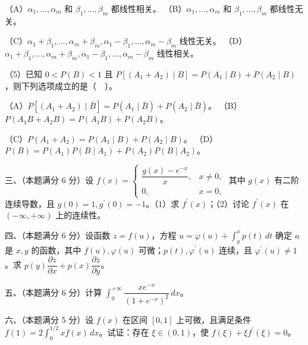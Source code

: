 \documentclass[UTF8,12pt]{ctexart}
\begin{document}
（A）\(\displaystyle \alpha_1,\allowbreak \ldots,\allowbreak \alpha_m\) 和 \(\displaystyle \beta_1,\allowbreak \ldots,\allowbreak \beta_m\) 都线性相关。 （B）\(\displaystyle \alpha_1,\allowbreak \ldots,\allowbreak \alpha_m\) 和 \(\displaystyle \beta_1,\allowbreak \ldots,\allowbreak \beta_m\) 都线性无关。


（C）\(\displaystyle \alpha_1+\beta_1,\allowbreak \ldots,\allowbreak \alpha_m+\beta_m,\allowbreak \alpha_1-\beta_1,\allowbreak \ldots,\allowbreak \alpha_m-\beta_m\) 线性无关。 （D）\(\displaystyle \alpha_1+\beta_1,\allowbreak \ldots,\allowbreak \alpha_m+\beta_m,\allowbreak \alpha_1-\beta_1,\allowbreak \ldots,\allowbreak \alpha_m-\beta_m\) 线性相关。


（5）已知 \(\displaystyle 0<P(B)<1\) 且 \(\displaystyle P[(A_1+A_2)\mid B]=P(A_1\mid B)+P(A_2\mid B)\)，则下列选项成立的是（　）。


（A）\(\displaystyle P[(A_1+A_2)\mid\bar B]=P(A_1\mid\bar B)+P(A_2\mid\bar B)\)。 （B）\(\displaystyle P(A_1B+A_2B)=P(A_1B)+P(A_2B)\)。


（C）\(\displaystyle P(A_1+A_2)=P(A_1\mid B)+P(A_2\mid B)\)。 （D）\(\displaystyle P(B)=P(A_1)P(B\mid A_1)+P(A_2)P(B\mid A_2)\)。


三、（本题满分 6 分）设 \(\displaystyle f(x)=\begin{cases}\dfrac{\displaystyle g(x)-e^{-x}}{\displaystyle x},\allowbreak &x\ne0,\allowbreak \\0,\allowbreak &x=0,\allowbreak \end{cases}\) 其中 \(\displaystyle g(x)\) 有二阶连续导数，且 \(\displaystyle g(0)=1,\allowbreak g^{\prime}(0)=-1\)。（1）求 \(\displaystyle f^{\prime}(x)\)；（2）讨论 \(\displaystyle f^{\prime}(x)\) 在 \(\displaystyle ( -\infty,\allowbreak +\infty)\) 上的连续性。


四、（本题满分 6 分）设函数 \(\displaystyle z=f(u)\)，方程 \(\displaystyle u=\varphi(u)+\displaystyle \int_y^x p(t)\,dt\) 确定 \(\displaystyle u\) 是 \(\displaystyle x,\allowbreak y\) 的函数，其中 \(\displaystyle f(u),\allowbreak \varphi(u)\) 可微；\(\displaystyle p(t),\allowbreak \varphi^{\prime}(u)\) 连续，且 \(\displaystyle \varphi^{\prime}(u)\ne1\)。求 \(\displaystyle p(y)\dfrac{\displaystyle \partial z}{\displaystyle \partial x}+p(x)\dfrac{\displaystyle \partial z}{\displaystyle \partial y}\)。


五、（本题满分 6 分）计算 \(\displaystyle \int_0^{+\infty}\dfrac{\displaystyle xe^{-x}}{\displaystyle (1+e^{-x})^2}\,dx\)。


六、（本题满分 5 分）设 \(\displaystyle f(x)\) 在区间 \(\displaystyle [0,\allowbreak 1]\) 上可微，且满足条件 \(\displaystyle f(1)=2\displaystyle \int_0^{1/2}xf(x)\,dx\)。试证：存在 \(\displaystyle \xi\in(0,\allowbreak 1)\)，使 \(\displaystyle f(\xi)+\xi f^{\prime}(\xi)=0\)。
\end{document}
